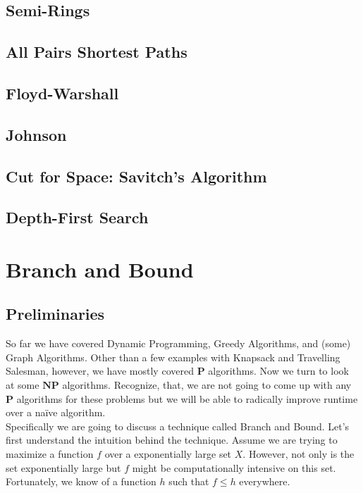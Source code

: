 \documentclass[11pt]{article}
\theoremstyle{plain}
\theoremstyle{definition}
\numberwithin{equation}{section}
\numberwithin{figure}{section}
\begin{document}
\subsection{Semi-Rings}

\subsection{All Pairs Shortest Paths}

\subsection{Floyd-Warshall}

\subsection{Johnson}

\subsection{Cut for Space: Savitch's Algorithm}

\subsection{Depth-First Search}


\newpage
\section{Branch and Bound}

\subsection{Preliminaries}
So far we have covered Dynamic Programming, Greedy Algorithms, and (some) Graph Algorithms. Other than a few examples with Knapsack and Travelling Salesman, however, we have mostly covered $\textbf{P}$ algorithms. Now we turn to look at some $\textbf{NP}$ algorithms. Recognize, that, we are not going to come up with any $\textbf{P}$ algorithms for these problems but we will be able to radically improve runtime over a na\"ive algorithm. \\

\noindent Specifically we are going to discuss a technique called Branch and Bound. Let's first understand the intuition behind the technique. Assume we are trying to maximize a function $f$ over a exponentially large set $X$. However, not only is the set exponentially large but $f$ might be computationally intensive on this set. Fortunately, we know of a function $h$ such that $f \leq h$ everywhere. \\
\end{document}

